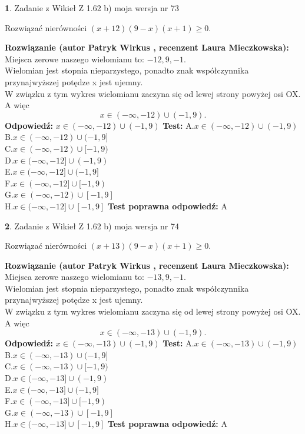 \documentclass[12pt, a4paper]{article}
\theoremstyle{definition} %
\newtheorem{zad}{}
\newcommand{\zadStart}[1]{\begin{zad}#1\newline}
\newcommand{\zadStop}{\end{zad}}
\newcommand{\rozwStart}[2]{\noindent \textbf{Rozwiązanie (autor #1 , recenzent #2): }\newline}
\newcommand{\rozwStop}{\newline}
\newcommand{\odpStart}{\noindent \textbf{Odpowiedź:}\newline}
\newcommand{\odpStop}{\newline}
\newcommand{\testStart}{\noindent \textbf{Test:}\newline}
\newcommand{\testStop}{\newline}
\newcommand{\kluczStart}{\noindent \textbf{Test poprawna odpowiedź:}\newline}
\newcommand{\kluczStop}{\newline}
\begin{document}
\zadStart{Zadanie z Wikieł Z 1.62 b) moja wersja nr 73}

Rozwiązać nierówności $(x+12)(9-x)(x+1)\ge0$.
\zadStop
\rozwStart{Patryk Wirkus}{Laura Mieczkowska}
Miejsca zerowe naszego wielomianu to: $-12, 9, -1$.\\
Wielomian jest stopnia nieparzystego, ponadto znak współczynnika przy\linebreak najwyższej potędze x jest ujemny.\\ W związku z tym wykres wielomianu zaczyna się od lewej strony powyżej osi OX. A więc $$x \in (-\infty,-12) \cup (-1,9).$$
\rozwStop
\odpStart
$x \in (-\infty,-12) \cup (-1,9)$
\odpStop
\testStart
A.$x \in (-\infty,-12) \cup (-1,9)$\\
B.$x \in (-\infty,-12) \cup (-1,9]$\\
C.$x \in (-\infty,-12) \cup [-1,9)$\\
D.$x \in (-\infty,-12] \cup (-1,9)$\\
E.$x \in (-\infty,-12] \cup (-1,9]$\\
F.$x \in (-\infty,-12] \cup [-1,9)$\\
G.$x \in (-\infty,-12) \cup [-1,9]$\\
H.$x \in (-\infty,-12] \cup [-1,9]$
\testStop
\kluczStart
A
\kluczStop



\zadStart{Zadanie z Wikieł Z 1.62 b) moja wersja nr 74}

Rozwiązać nierówności $(x+13)(9-x)(x+1)\ge0$.
\zadStop
\rozwStart{Patryk Wirkus}{Laura Mieczkowska}
Miejsca zerowe naszego wielomianu to: $-13, 9, -1$.\\
Wielomian jest stopnia nieparzystego, ponadto znak współczynnika przy\linebreak najwyższej potędze x jest ujemny.\\ W związku z tym wykres wielomianu zaczyna się od lewej strony powyżej osi OX. A więc $$x \in (-\infty,-13) \cup (-1,9).$$
\rozwStop
\odpStart
$x \in (-\infty,-13) \cup (-1,9)$
\odpStop
\testStart
A.$x \in (-\infty,-13) \cup (-1,9)$\\
B.$x \in (-\infty,-13) \cup (-1,9]$\\
C.$x \in (-\infty,-13) \cup [-1,9)$\\
D.$x \in (-\infty,-13] \cup (-1,9)$\\
E.$x \in (-\infty,-13] \cup (-1,9]$\\
F.$x \in (-\infty,-13] \cup [-1,9)$\\
G.$x \in (-\infty,-13) \cup [-1,9]$\\
H.$x \in (-\infty,-13] \cup [-1,9]$
\testStop
\kluczStart
A
\kluczStop
\end{document}
